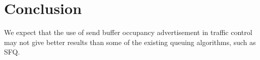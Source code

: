 \chapter{Conclusion}
We expect that the use of send buffer occupancy advertisement in
traffic control may not give better results than some of the existing queuing
algorithms, such as SFQ.
